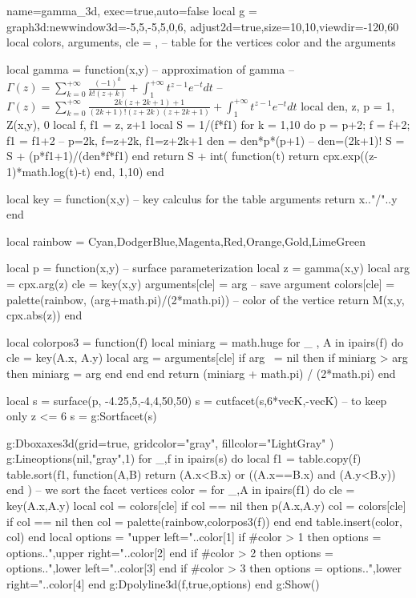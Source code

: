 \documentclass[10pt]{standalone}%
\begin{document}
\begin{luadraw}{name=gamma_3d, exec=true,auto=false}
local g = graph3d:new{window3d={-5,5,-5,5,0,6}, adjust2d=true,size={10,10},viewdir={-120,60}}
local colors, arguments, cle = {}, {} -- table for the vertices color and the arguments

local gamma = function(x,y) -- approximation of gamma
-- $\Gamma(z) = \sum_{k=0}^{+\infty} \frac{(-1)^k}{k!(z+k)} + \int_1^{+\infty} t^{z-1}e^{-t}dt$
-- $\Gamma(z) = \sum_{k=0}^{+\infty} \frac{2k(z+2k+1)+1}{(2k+1)!(z+2k)(z+2k+1)} + \int_1^{+\infty} t^{z-1}e^{-t}dt$
    local den, z, p = 1, Z(x,y), 0
    local f, f1 = z, z+1
    local S = 1/(f*f1)
    for k = 1,10 do
        p = p+2; f = f+2; f1 = f1+2 -- p=2k, f=z+2k, f1=z+2k+1
        den = den*p*(p+1) -- den=(2k+1)!
        S = S + (p*f1+1)/(den*f*f1)
    end
    return S + int( function(t) return cpx.exp((z-1)*math.log(t)-t) end, 1,10)
end

local key = function(x,y) -- key calculus for the table arguments
    return x.."/"..y
end

local rainbow = {Cyan,DodgerBlue,Magenta,Red,Orange,Gold,LimeGreen}

local  p = function(x,y) -- surface parameterization
    local z = gamma(x,y)
    local arg = cpx.arg(z)
    cle = key(x,y)
    arguments[cle] = arg -- save argument
    colors[cle] = palette(rainbow, (arg+math.pi)/(2*math.pi)) -- color of the vertice
    return M(x,y, cpx.abs(z))
end

local colorpos3 = function(f)
  local miniarg = math.huge
  for _ , A in ipairs(f) do
    cle = key(A.x, A.y)
    local arg = arguments[cle]
    if arg ~= nil then
      if miniarg > arg then 
        miniarg = arg
      end
    end
end
  return (miniarg + math.pi) / (2*math.pi)
end

local s = surface(p, -4.25,5,-4,4,{50,50})
s = cutfacet(s,{6*vecK,-vecK})  -- to keep only z <= 6
s = g:Sortfacet(s)
   
g:Dboxaxes3d({grid=true, gridcolor="gray", fillcolor="LightGray" })
g:Lineoptions(nil,"gray",1)
for _,f in ipairs(s) do
    local f1 = table.copy(f)
    table.sort(f1, function(A,B) return (A.x<B.x) or ((A.x==B.x) and (A.y<B.y)) end ) -- we sort the facet vertices
    color = {}
    for _,A in ipairs(f1) do
        cle = key(A.x,A.y)
        local col = colors[cle]
        if col == nil then
            p(A.x,A.y)
            col = colors[cle]
            if col == nil then col = palette(rainbow,colorpos3(f)) end
        end
        table.insert(color, col)
    end
    local options = "upper left="..color[1]
    if #color > 1 then options = options..",upper right="..color[2] end
    if #color > 2 then options = options..",lower left="..color[3] end
    if #color > 3 then options = options..",lower right="..color[4] end
    g:Dpolyline3d(f,true,options)
end
g:Show()
\end{luadraw}
\end{document}

